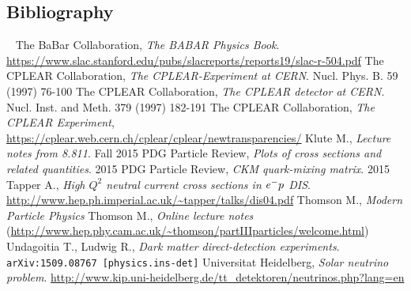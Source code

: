 \begin{appendices}
\section{Bibliography}
~
\bibspace The BaBar Collaboration, \emph{The BABAR Physics Book}. \url{https://www.slac.stanford.edu/pubs/slacreports/reports19/slac-r-504.pdf}
\bibspace The CPLEAR Collaboration, \emph{The CPLEAR-Experiment at CERN}. Nucl. Phys. B. 59 (1997) 76-100
\bibspace The CPLEAR Collaboration, \emph{The CPLEAR detector at CERN}. Nucl. Inst. and Meth. 379 (1997) 182-191
\bibspace The CPLEAR Collaboration, \emph{The CPLEAR Experiment}, \\ \url{https://cplear.web.cern.ch/cplear/cplear/newtransparencies/}
\bibspace Klute M., \emph{Lecture notes from 8.811}. Fall 2015
\bibspace PDG Particle Review, \emph{Plots of cross sections and related quantities}. 2015
\bibspace PDG Particle Review, \emph{CKM quark-mixing matrix}. 2015
\bibspace Tapper A., \emph{High $Q^2$ neutral current cross sections in $e^{-} p$ DIS}. \url{http://www.hep.ph.imperial.ac.uk/~tapper/talks/dis04.pdf}
\bibspace Thomson M., \emph{Modern Particle Physics}
\bibspace Thomson M., \emph{Online lecture notes} (\url{http://www.hep.phy.cam.ac.uk/~thomson/partIIIparticles/welcome.html})
\bibspace Undagoitia T., Ludwig R., \emph{Dark matter direct-detection experiments}.  \verb|arXiv:1509.08767 [physics.ins-det]|
\bibspace Universitat Heidelberg, \emph{Solar neutrino problem}. \url{http://www.kip.uni-heidelberg.de/tt_detektoren/neutrinos.php?lang=en}

\end{appendices}


